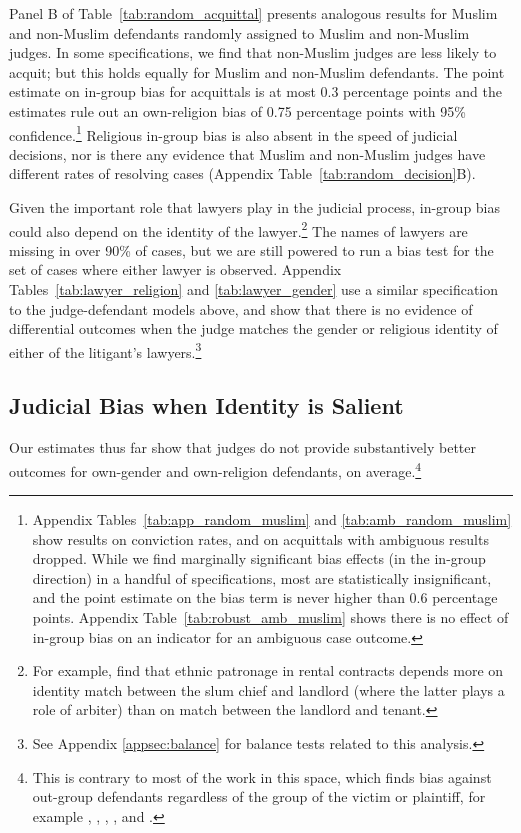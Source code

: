 \documentclass[12pt,english]{article}
\begin{document}
Panel B of Table~\ref{tab:random_acquittal} presents analogous results for Muslim and non-Muslim defendants randomly assigned to Muslim and non-Muslim judges. In some specifications, we find that non-Muslim judges are less likely to acquit; but this holds equally for Muslim and non-Muslim defendants. The point estimate on in-group bias for acquittals is at most 0.3 percentage points and the estimates rule out an own-religion bias of 0.75 percentage points with 95\% confidence.\footnote{Appendix Tables~\ref{tab:app_random_muslim} and \ref{tab:amb_random_muslim} show results on conviction rates, and on acquittals with ambiguous results dropped. While we find marginally significant bias effects (in the in-group direction) in a handful of specifications, most are statistically insignificant, and the point estimate on the bias term is never higher than 0.6 percentage points. Appendix Table~\ref{tab:robust_amb_muslim} shows there is no effect of in-group bias on an indicator for an ambiguous case outcome.} Religious in-group bias is also absent in the speed of judicial decisions, nor is there any evidence that Muslim and non-Muslim judges have different rates of resolving cases (Appendix Table~\ref{tab:random_decision}B).

Given the important role that lawyers play in the judicial process, in-group bias could also depend on the identity of the lawyer.\footnote{For example, \citet{marx2019} find that ethnic patronage in rental contracts depends more on identity match between the slum chief and landlord (where the latter plays a role of arbiter) than on match between the landlord and tenant.} The names of lawyers are missing in over 90\% of cases, but we are still powered to run a bias test for the set of cases where either lawyer is observed. Appendix Tables~\ref{tab:lawyer_religion} and \ref{tab:lawyer_gender} use a similar specification to the judge-defendant models above, and show that there is no evidence of differential outcomes when the judge matches the gender or religious identity of either of the litigant's lawyers.\footnote{See Appendix \ref{appsec:balance} for balance tests related to this analysis.} 

\subsection{Judicial Bias when Identity is Salient}

Our estimates thus far show that judges do not provide substantively better outcomes for own-gender and own-religion defendants, on average.\footnote{This is contrary to most of the work in this space, which finds bias against out-group defendants regardless of the group of the victim or plaintiff, for example \citep{grossman2016descriptive}, \citep{AnwarBayerHjalmarsson2012TQJoE}, 
    \citep{gazal2010let}, \citep{sloane2019racial}, and \citep{Didwania2018CLE}.}
\end{document}
